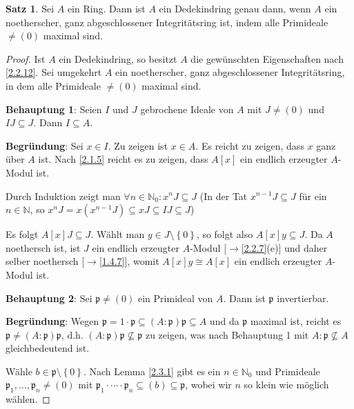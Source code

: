 \documentclass[
twoside=semi,
fontsize=12,
DIV=12, 
cleardoublepage=current,
leqno,
headings=optiontoheadandtoc, 
toc=idx
]{scrbook}
\newcommand{\N}{\mathbb{N}}
\newcommand{\set}[1]{\left\{ #1 \right\}}
\theoremstyle{definition}
\newtheorem{satz}[definition]{Satz}
\begin{document}
   	\begin{satz}\label{2.3.2}
   		Sei $A$ ein Ring. Dann ist $A$ ein Dedekindring genau dann, wenn $A$ ein noetherscher, ganz abgeschlossener Integrit\"atsring ist, indem alle Primideale $\neq (0)$ maximal sind.
   			
   		\begin{proof}
   			Ist $A$ ein Dedekindring, so besitzt $A$ die gew\"unschten Eigenschaften nach \ref{2.2.12}. Sei umgekehrt $A$ ein noetherscher, ganz abgeschlossener Integrit\"atsring, in dem alle Primideale $\neq (0)$ maximal sind.
   			
   			{\color{red}	
   			\noindent
   			\textbf{Behauptung 1}: Seien $I$ und $J$ gebrochene Ideale von $A$ mit $J \neq (0)$ und $IJ \subseteq J$. Dann $I \subseteq A$.
   				
   			\smallskip\noindent
   			\textbf{Begr\"undung}: Sei $x \in I$. Zu zeigen ist $x \in A$. Es reicht zu zeigen, dass $x$ ganz \"uber $A$ ist. Nach \ref{2.1.5} reicht es zu zeigen, dass $A[x]$ ein endlich erzeugter $A$-Modul ist. 
   				
   			Durch Induktion zeigt man $\forall n \in \N_0: x^nJ \subseteq J$  (In der Tat $x^{n-1}J \subseteq J$ f\"ur ein $n\in \N$, so $x^nJ = x(x^{n-1}J) \subseteq xJ \subseteq IJ \subseteq J$)
   				
   			Es folgt $A[x]J \subseteq J$. W\"ahlt man $y \in J \setminus \set{0}$, so folgt also $A[x]y \subseteq J$. Da $A$ noethersch ist, ist $J$ ein endlich erzeugter $A$-Modul [$\to$\ref{2.2.7}(e)] und daher selber noethersch [$\to$\ref{1.4.7}], womit $A[x]y \cong A[x]$ ein endlich erzeugter $A$-Modul ist.
   				
   			\medskip\noindent
   			\textbf{Behauptung 2}: Sei $\mathfrak{p} \neq (0)$ ein Primideal von $A$. Dann ist $\mathfrak{p}$ invertierbar.
   		
   			\smallskip\noindent
   			\textbf{Begründung}: Wegen $\mathfrak{p} = 1 \cdot \mathfrak{p} \subseteq (A:\mathfrak{p})\mathfrak{p} \subseteq A$ und da $\mathfrak{p}$ maximal ist, reicht es $\mathfrak{p} \neq (A:\mathfrak{p})\mathfrak{p}$, d.h. $(A:\mathfrak{p})\mathfrak{p} \nsubseteq \mathfrak{p}$ zu zeigen, was nach Behauptung 1 mit $A:\mathfrak{p} \nsubseteq A$ gleichbedeutend ist.
   			
   			\noindent W\"ahle $b \in \mathfrak{p} \setminus \set{0}$. Nach Lemma \ref{2.3.1} gibt es ein $n \in \N_0$ und Primideale $\mathfrak{p}_1, \dots, \mathfrak{p}_n \neq (0)$ mit $\mathfrak{p}_1 \cdot \cdots \cdot \mathfrak{p}_n \subseteq (b) \subseteq \mathfrak{p}$, wobei wir $n$ so klein wie m\"oglich w\"ahlen.
   			
}
\end{proof}
\end{satz}
\end{document}
